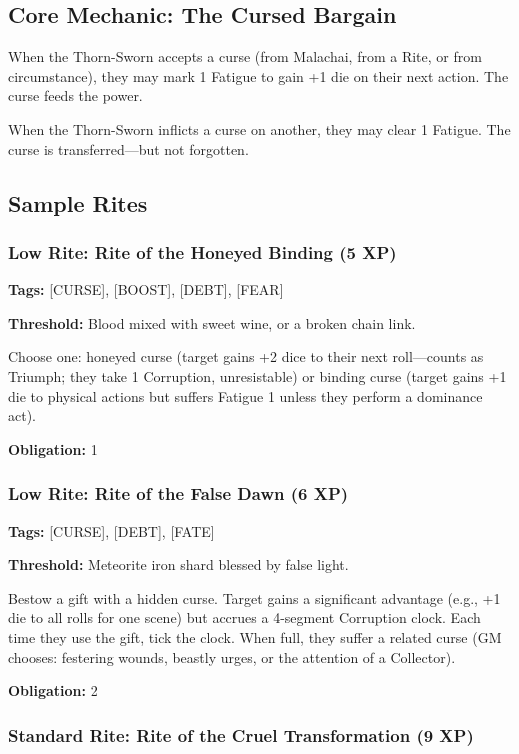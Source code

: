 \subsection{Core Mechanic: The Cursed Bargain}

When the Thorn-Sworn accepts a curse (from Malachai, from a Rite, or from circumstance), they may mark 1 Fatigue to gain +1 die on their next action. The curse feeds the power.

When the Thorn-Sworn inflicts a curse on another, they may clear 1 Fatigue. The curse is transferred—but not forgotten.

\subsection{Sample Rites}

\subsubsection{Low Rite: Rite of the Honeyed Binding (5 XP)}

\textbf{Tags:} [CURSE], [BOOST], [DEBT], [FEAR]

\textbf{Threshold:} Blood mixed with sweet wine, or a broken chain link.

Choose one: honeyed curse (target gains +2 dice to their next roll—counts as Triumph; they take 1 Corruption, unresistable) or binding curse (target gains +1 die to physical actions but suffers Fatigue 1 unless they perform a dominance act).

\textbf{Obligation:} 1

\subsubsection{Low Rite: Rite of the False Dawn (6 XP)}

\textbf{Tags:} [CURSE], [DEBT], [FATE]

\textbf{Threshold:} Meteorite iron shard blessed by false light.

Bestow a gift with a hidden curse. Target gains a significant advantage (e.g., +1 die to all rolls for one scene) but accrues a 4-segment Corruption clock. Each time they use the gift, tick the clock. When full, they suffer a related curse (GM chooses: festering wounds, beastly urges, or the attention of a Collector).

\textbf{Obligation:} 2

\subsubsection{Standard Rite: Rite of the Cruel Transformation (9 XP)}

